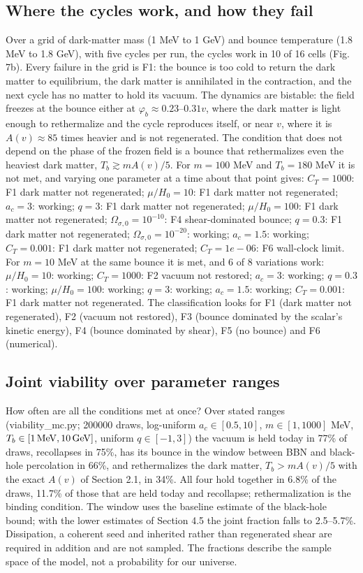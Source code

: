 \documentclass[11pt,a4paper]{article}
\begin{document}
\subsection{Where the cycles work, and how they fail}
Over a grid of dark-matter mass (1 MeV to 1 GeV) and bounce temperature (1.8 MeV to 1.8 GeV), with five cycles per run, the cycles work in 10 of 16 cells (Fig. 7b). Every failure in the grid is F1: the bounce is too cold to return the dark matter to equilibrium, the dark matter is annihilated in the contraction, and the next cycle has no matter to hold its vacuum. The dynamics are bistable: the field freezes at the bounce either at $\varphi_b\approx0.23$--$0.31v$, where the dark matter is light enough to rethermalize and the cycle reproduces itself, or near $v$, where it is $A(v)\approx85$ times heavier and is not regenerated. The condition that does not depend on the phase of the frozen field is a bounce that rethermalizes even the heaviest dark matter, $T_b\gtrsim mA(v)/5$. For $m=100$ MeV and $T_b=180$ MeV it is not met, and varying one parameter at a time about that point gives: $C_T=1000$: F1 dark matter not regenerated; $\mu/H_0=10$: F1 dark matter not regenerated; $a_c=3$: working; $q=3$: F1 dark matter not regenerated; $\mu/H_0=100$: F1 dark matter not regenerated; $\Omega_{\sigma,0}=10^{-10}$: F4 shear-dominated bounce; $q=0.3$: F1 dark matter not regenerated; $\Omega_{\sigma,0}=10^{-20}$: working; $a_c=1.5$: working; $C_T=0.001$: F1 dark matter not regenerated; $C_T=1e-06$: F6 wall-clock limit. For $m=10$ MeV at the same bounce it is met, and 6 of 8 variations work: $\mu/H_0=10$: working; $C_T=1000$: F2 vacuum not restored; $a_c=3$: working; $q=0.3$: working; $\mu/H_0=100$: working; $q=3$: working; $a_c=1.5$: working; $C_T=0.001$: F1 dark matter not regenerated. The classification looks for F1 (dark matter not regenerated), F2 (vacuum not restored), F3 (bounce dominated by the scalar's kinetic energy), F4 (bounce dominated by shear), F5 (no bounce) and F6 (numerical).

\subsection{Joint viability over parameter ranges}
How often are all the conditions met at once? Over stated ranges (viability\_mc.py; 200000 draws, log-uniform $a_c\in[0.5,10]$, $m\in[1,1000]$ MeV, $T_b\in[1\,{\rm MeV},10\,{\rm GeV}]$, uniform $q\in[-1,3]$) the vacuum is held today in 77\% of draws, recollapses in 75\%, has its bounce in the window between BBN and black-hole percolation in 66\%, and rethermalizes the dark matter, $T_b>mA(v)/5$ with the exact $A(v)$ of Section 2.1, in 34\%. All four hold together in 6.8\% of the draws, 11.7\% of those that are held today and recollapse; rethermalization is the binding condition. The window uses the baseline estimate of the black-hole bound; with the lower estimates of Section 4.5 the joint fraction falls to 2.5--5.7\%. Dissipation, a coherent seed and inherited rather than regenerated shear are required in addition and are not sampled. The fractions describe the sample space of the model, not a probability for our universe.
\end{document}
